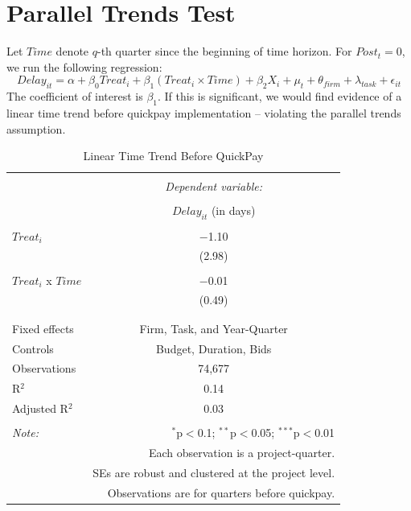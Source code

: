 \documentclass[
]{article}
\begin{document}
\hypertarget{parallel-trends-test}{%
\section{Parallel Trends Test}\label{parallel-trends-test}}

Let \(Time\) denote \(q\)-th quarter since the beginning of time
horizon. For \(Post_t =0\), we run the following regression:
\[ Delay_{it} = \alpha+\beta_0 Treat_i + \beta_1 (Treat_i \times Time) + \beta_2 X_i + \mu_t + \theta_{firm} + \lambda_{task} +\epsilon_{it}\]
The coefficient of interest is \(\beta_1\). If this is significant, we
would find evidence of a linear time trend before quickpay
implementation -- violating the parallel trends assumption.

\begin{table}[H] \centering 
  \caption{Linear Time Trend Before QuickPay} 
  \label{} 
\small 
\begin{tabular}{@{\extracolsep{5pt}}lc} 
\\[-1.8ex]\hline 
\hline \\[-1.8ex] 
 & \multicolumn{1}{c}{\textit{Dependent variable:}} \\ 
\cline{2-2} 
\\[-1.8ex] & $Delay_{it}$ (in days) \\ 
\hline \\[-1.8ex] 
 $Treat_i$ & $-$1.10 \\ 
  & (2.98) \\ 
  & \\ 
 $Treat_i$ x $ Time$ & $-$0.01 \\ 
  & (0.49) \\ 
  & \\ 
\hline \\[-1.8ex] 
Fixed effects & Firm, Task, and Year-Quarter \\ 
Controls & Budget, Duration, Bids \\ 
Observations & 74,677 \\ 
R$^{2}$ & 0.14 \\ 
Adjusted R$^{2}$ & 0.03 \\ 
\hline 
\hline \\[-1.8ex] 
\textit{Note:}  & \multicolumn{1}{r}{$^{*}$p$<$0.1; $^{**}$p$<$0.05; $^{***}$p$<$0.01} \\ 
 & \multicolumn{1}{r}{Each observation is a project-quarter.} \\ 
 & \multicolumn{1}{r}{SEs are robust and clustered at the project level.} \\ 
 & \multicolumn{1}{r}{Observations are for quarters before quickpay.} \\ 
\end{tabular} 
\end{table}
\end{document}
